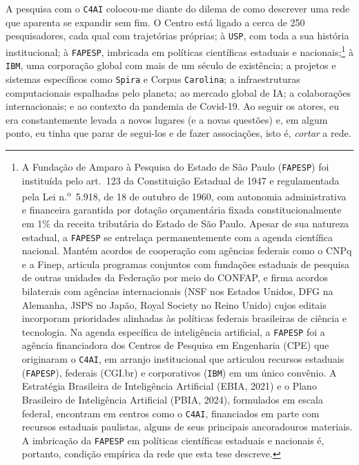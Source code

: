 A pesquisa com o \texttt{C4AI} colocou-me diante do dilema de como descrever uma rede que aparenta se expandir sem fim. O Centro está ligado a cerca de 250 pesquisadores, cada qual com trajetórias próprias; à \texttt{USP}, com toda a sua história institucional; à \texttt{FAPESP}, imbricada em políticas científicas estaduais e nacionais;\footnote{A Fundação de Amparo à Pesquisa do Estado de São Paulo (\texttt{FAPESP}) foi instituída pelo art.~123 da Constituição Estadual de 1947 e regulamentada pela Lei n.\textsuperscript{o}~5.918, de 18 de outubro de 1960, com autonomia administrativa e financeira garantida por dotação orçamentária fixada constitucionalmente em 1\% da receita tributária do Estado de São Paulo. Apesar de sua natureza estadual, a \texttt{FAPESP} se entrelaça permanentemente com a agenda científica nacional. Mantém acordos de cooperação com agências federais como o CNPq e a Finep, articula programas conjuntos com fundações estaduais de pesquisa de outras unidades da Federação por meio do CONFAP, e firma acordos bilaterais com agências internacionais (NSF nos Estados Unidos, DFG na Alemanha, JSPS no Japão, Royal Society no Reino Unido) cujos editais incorporam prioridades alinhadas às políticas federais brasileiras de ciência e tecnologia. Na agenda específica de inteligência artificial, a \texttt{FAPESP} foi a agência financiadora dos Centros de Pesquisa em Engenharia (CPE) que originaram o \texttt{C4AI}, em arranjo institucional que articulou recursos estaduais (\texttt{FAPESP}), federais (CGI.br) e corporativos (\texttt{IBM}) em um único convênio. A Estratégia Brasileira de Inteligência Artificial (EBIA, 2021) e o Plano Brasileiro de Inteligência Artificial (PBIA, 2024), formulados em escala federal, encontram em centros como o \texttt{C4AI}, financiados em parte com recursos estaduais paulistas, alguns de seus principais ancoradouros materiais. A imbricação da \texttt{FAPESP} em políticas científicas estaduais e nacionais é, portanto, condição empírica da rede que esta tese descreve.} à \texttt{IBM}, uma corporação global com mais de um século de existência; a projetos e sistemas específicos como \texttt{Spira} e Corpus \texttt{Carolina}; a infraestruturas computacionais espalhadas pelo planeta; ao mercado global de IA; a colaborações internacionais; e ao contexto da pandemia de Covid-19. Ao seguir os atores, eu era constantemente levada a novos lugares (e a novas questões) e, em algum ponto, eu tinha que parar de segui-los e de fazer associações, isto é, \textit{cortar} a rede.

